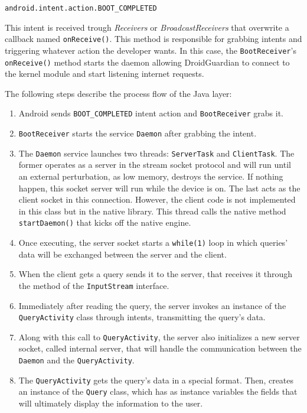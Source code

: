 \indent \texttt{android.intent.action.BOOT\_COMPLETED}

This intent is received trough \textit{Receivers} or \textit{BroadcastReceivers} that overwrite a callback named \texttt{onReceive()}. This method is responsible for grabbing intents and triggering whatever action the developer wants. In this case, the \texttt{BootReceiver}'s \texttt{onReceive()} method starts the daemon allowing DroidGuardian to connect to the kernel module and start listening internet requests.

The following steps describe the process flow of the Java layer:

\begin{enumerate}
\item Android sends \texttt{BOOT\_COMPLETED} intent action and \texttt{BootReceiver} grabs it.
\item \texttt{BootReceiver} starts the service \texttt{Daemon} after grabbing the intent.
\item The \texttt{Daemon} service launches two threads: \texttt{ServerTask} and \texttt{ClientTask}. The former operates as a server in the stream socket protocol and will run until an external perturbation, as low memory, destroys the service. If nothing happen, this socket server will run while the device is on. The last acts as the client socket in this connection. However, the client code is not implemented in this class but in the native library. This thread calls the native method \texttt{startDaemon()} that kicks off the native engine.
\item Once executing, the server socket starts a \texttt{while(1)} loop in which queries' data will be exchanged between the server and the client.
\item When the client gets a query sends it to the server, that receives it through the  method of the \texttt{InputStream} interface.
\item Immediately after reading the query, the server invokes an instance of the \texttt{QueryActivity} class through intents, transmitting the query's data.
\item Along with this call to \texttt{QueryActivity}, the server also initializes a new server socket, called internal server, that will handle the communication between the \texttt{Daemon} and the \texttt{QueryActivity}.
\item The \texttt{QueryActivity} gets the query's data in a special format. Then, creates an instance of the \texttt{Query} class, which has as instance variables the fields that will ultimately display the information to the user.

\end{enumerate}
